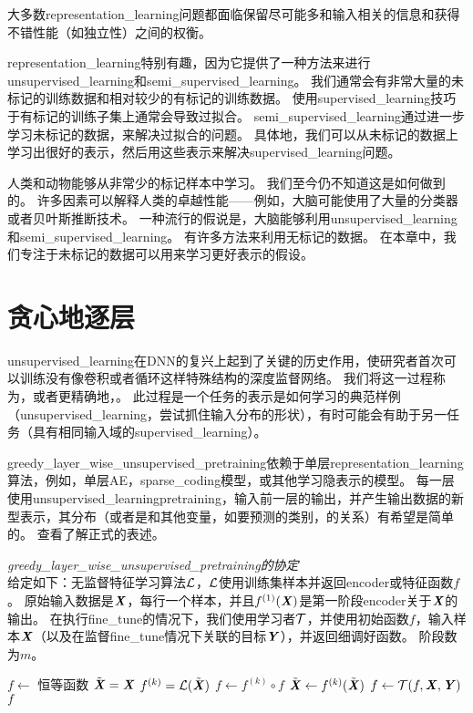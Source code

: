 大多数\gls{representation_learning}问题都面临保留尽可能多和输入相关的信息和获得不错性能（如独立性）之间的权衡。


\gls{representation_learning}特别有趣，因为它提供了一种方法来进行\gls{unsupervised_learning}和\gls{semi_supervised_learning}。
我们通常会有非常大量的未标记的训练数据和相对较少的有标记的训练数据。
使用\gls{supervised_learning}技巧于有标记的训练子集上通常会导致过拟合。
\gls{semi_supervised_learning}通过进一步学习未标记的数据，来解决过拟合的问题。
具体地，我们可以从未标记的数据上学习出很好的表示，然后用这些表示来解决\gls{supervised_learning}问题。


人类和动物能够从非常少的标记样本中学习。
我们至今仍不知道这是如何做到的。
许多因素可以解释人类的卓越性能——例如，大脑可能使用了大量的分类器或者贝叶斯推断技术。
一种流行的假说是，大脑能够利用\gls{unsupervised_learning}和\gls{semi_supervised_learning}。
有许多方法来利用无标记的数据。
在本章中，我们专注于未标记的数据可以用来学习更好表示的假设。


\section{贪心地逐层}
\label{sec:greedy_layer_wise_unsupervised_pretraining}
\gls{unsupervised_learning}在\gls{DNN}的复兴上起到了关键的历史作用，使研究者首次可以训练没有像卷积或者循环这样特殊结构的深度监督网络。
我们将这一过程称为，或者更精确地，。
此过程是一个任务的表示是如何学习的典范样例（\gls{unsupervised_learning}，尝试抓住输入分布的形状），有时可能会有助于另一任务（具有相同输入域的\gls{supervised_learning}）。


\gls{greedy_layer_wise_unsupervised_pretraining}依赖于单层\gls{representation_learning}算法，例如，单层\gls{AE}，\gls{sparse_coding}模型，或其他学习隐表示的模型。
每一层使用\gls{unsupervised_learning}\gls{pretraining}，输入前一层的输出，并产生输出数据的新型表示，其分布（或者是和其他变量，如要预测的类别，的关系）有希望是简单的。
查看了解正式的表述。

\begin{algorithm}
\caption{{\em \gls{greedy_layer_wise_unsupervised_pretraining}的协定}\\
给定如下：无监督特征学习算法$\mathcal{L}$，$\mathcal{L}$使用训练集样本并返回\gls{encoder}或特征函数$f$。
原始输入数据是$\boldsymbol{\mathit{X}}$，每行一个样本，并且$f^{(1)}(\boldsymbol{\mathit{X}})$是第一阶段\gls{encoder}关于$\boldsymbol{\mathit{X}}$的输出。
在执行\gls{fine_tune}的情况下，我们使用学习者$\mathcal{T}$，并使用初始函数$f$，输入样本$\boldsymbol{\mathit{X}}$（以及在监督\gls{fine_tune}情况下关联的目标$\boldsymbol{\mathit{Y}}$），并返回细调好函数。 阶段数为$m$。
}
\label{alg:pretraining}
\begin{algorithmic}
\STATE $f \leftarrow$ 恒等函数
\STATE $\tilde{\boldsymbol{\mathit{X}}} = \boldsymbol{\mathit{X}}$
  \STATE $f^{(k)} = {\mathcal{L}}(\tilde{\boldsymbol{\mathit{X}}})$
  \STATE $f \leftarrow f^{(k)} \circ f$
  \STATE $\tilde{\boldsymbol{\mathit{X}}} \leftarrow f^{(k)}(\tilde{\boldsymbol{\mathit{X}}})$
\ENDFOR
{}
  \STATE $f \leftarrow {\mathcal{T}}(f,\boldsymbol{\mathit{X}},\boldsymbol{\mathit{Y}})$
\ENDIF
{} $f$
\end{algorithmic}
\end{algorithm}


